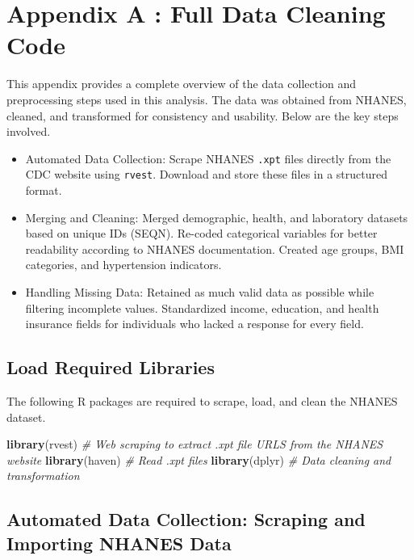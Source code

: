 \documentclass[
]{article}
\newenvironment{Shaded}{\begin{snugshade}}{\end{snugshade}}
\newcommand{\CommentTok}[1]{\textcolor[rgb]{0.56,0.35,0.01}{\textit{#1}}}
\newcommand{\FunctionTok}[1]{\textcolor[rgb]{0.13,0.29,0.53}{\textbf{#1}}}
\newcommand{\NormalTok}[1]{#1}
\providecommand{\tightlist}{%
  \setlength{\itemsep}{0pt}\setlength{\parskip}{0pt}}
\begin{document}
\section{Appendix A : Full Data Cleaning
Code}\label{appendix-a-full-data-cleaning-code}

This appendix provides a complete overview of the data collection and
preprocessing steps used in this analysis. The data was obtained from
NHANES, cleaned, and transformed for consistency and usability. Below
are the key steps involved.

\begin{itemize}
\tightlist
\item
  Automated Data Collection: Scrape NHANES \texttt{.xpt} files directly
  from the CDC website using \texttt{rvest}. Download and store these
  files in a structured format.
\item
  Merging and Cleaning: Merged demographic, health, and laboratory
  datasets based on unique IDs (SEQN). Re-coded categorical variables
  for better readability according to NHANES documentation. Created age
  groups, BMI categories, and hypertension indicators.
\item
  Handling Missing Data: Retained as much valid data as possible while
  filtering incomplete values. Standardized income, education, and
  health insurance fields for individuals who lacked a response for
  every field.
\end{itemize}

\subsection{Load Required Libraries}\label{load-required-libraries}

The following R packages are required to scrape, load, and clean the
NHANES dataset.

\begin{Shaded}
\begin{Highlighting}[]
\FunctionTok{library}\NormalTok{(rvest)        }\CommentTok{\# Web scraping to extract .xpt file URLS from the NHANES website }
\FunctionTok{library}\NormalTok{(haven)        }\CommentTok{\# Read .xpt files}
\FunctionTok{library}\NormalTok{(dplyr)        }\CommentTok{\# Data cleaning and transformation}
\end{Highlighting}
\end{Shaded}

\subsection{Automated Data Collection: Scraping and Importing NHANES
Data}\label{automated-data-collection-scraping-and-importing-nhanes-data}
\end{document}
